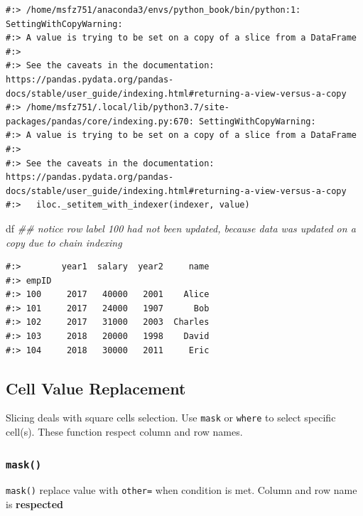 \documentclass[
]{book}
\newenvironment{Shaded}{\begin{snugshade}}{\end{snugshade}}
\newcommand{\CommentTok}[1]{\textcolor[rgb]{0.37,0.37,0.37}{\textit{#1}}}
\newcommand{\NormalTok}[1]{#1}
\begin{document}
\begin{verbatim}
#:> /home/msfz751/anaconda3/envs/python_book/bin/python:1: SettingWithCopyWarning: 
#:> A value is trying to be set on a copy of a slice from a DataFrame
#:> 
#:> See the caveats in the documentation: https://pandas.pydata.org/pandas-docs/stable/user_guide/indexing.html#returning-a-view-versus-a-copy
#:> /home/msfz751/.local/lib/python3.7/site-packages/pandas/core/indexing.py:670: SettingWithCopyWarning: 
#:> A value is trying to be set on a copy of a slice from a DataFrame
#:> 
#:> See the caveats in the documentation: https://pandas.pydata.org/pandas-docs/stable/user_guide/indexing.html#returning-a-view-versus-a-copy
#:>   iloc._setitem_with_indexer(indexer, value)
\end{verbatim}

\begin{Shaded}
\begin{Highlighting}[]
\NormalTok{df  }\CommentTok{## notice row label 100 had not been updated, because data was updated on a copy due to chain indexing}
\end{Highlighting}
\end{Shaded}

\begin{verbatim}
#:>        year1  salary  year2     name
#:> empID                               
#:> 100     2017   40000   2001    Alice
#:> 101     2017   24000   1907      Bob
#:> 102     2017   31000   2003  Charles
#:> 103     2018   20000   1998    David
#:> 104     2018   30000   2011     Eric
\end{verbatim}

\hypertarget{cell-value-replacement}{%
\subsection{Cell Value Replacement}\label{cell-value-replacement}}

Slicing deals with square cells selection. Use \texttt{mask} or \texttt{where} to select specific cell(s). These function respect column and row names.

\hypertarget{mask}{%
\subsubsection{\texorpdfstring{\texttt{mask()}}{mask()}}\label{mask}}

\texttt{mask()} replace value with \texttt{other=} when condition is met. Column and row name is \textbf{respected}
\end{document}
